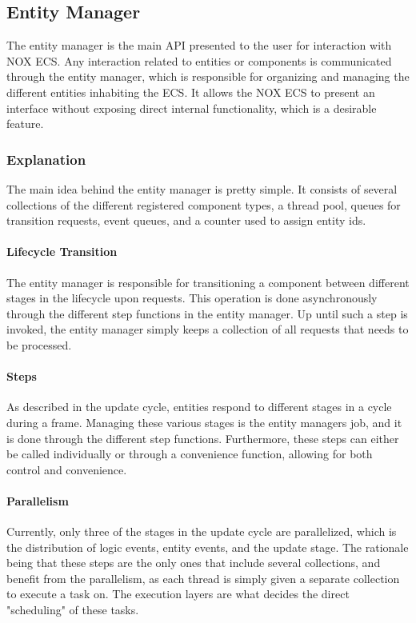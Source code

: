 \subsection{Entity Manager}
\label{subsec:detailed_entity_manager}
The entity manager is the main API presented to the user for interaction with NOX ECS.
Any interaction related to entities or components is communicated through the entity manager, which is responsible for organizing and managing the different entities inhabiting the ECS.
It allows the NOX ECS to present an interface without exposing direct internal functionality, which is a desirable feature.

\subsubsection{Explanation}
The main idea behind the entity manager is pretty simple.
It consists of several collections of the different registered component types,
a thread pool, queues for transition requests, event queues, and a counter
used to assign entity ids.

\paragraph{Lifecycle Transition}
The entity manager is responsible for transitioning a component between different stages in the lifecycle upon requests.
This operation is done asynchronously through the different step functions in the entity manager.
Up until such a step is invoked, the entity manager simply keeps a collection of all requests that needs to be processed.

\paragraph{Steps}
As described in the update cycle, entities respond to different stages in a cycle during a frame. Managing these various stages is the entity managers job, and it is done through the different step functions. 
Furthermore, these steps can either be called individually or through a convenience function, allowing for both control and convenience.

\paragraph{Parallelism}
Currently, only three of the stages in the update cycle are parallelized, which is
the distribution of logic events, entity events, and the update stage.
The rationale being that these steps are the only ones that include several collections, and benefit from the parallelism, as each thread is simply given a separate collection to execute a task on.
The execution layers are what decides the direct "scheduling" of these tasks.

